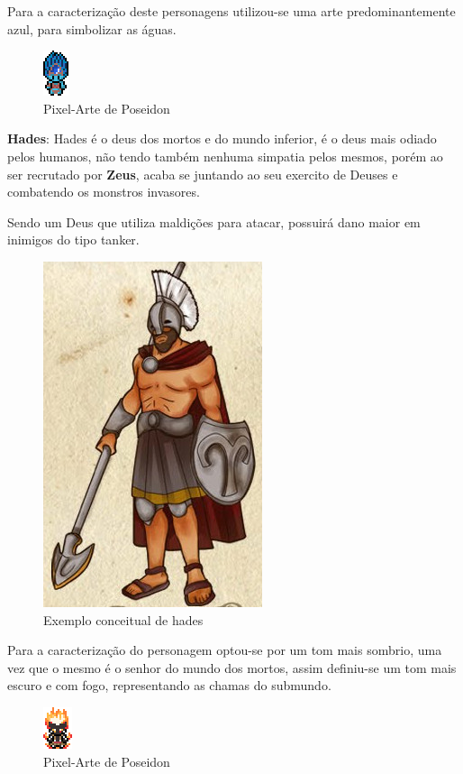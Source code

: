 \documentclass[11pt]{article} %
\begin{document}
Para a caracterização deste personagens utilizou-se uma arte predominantemente azul, para simbolizar as águas.

\begin{figure}[!htp]
\centering
\includegraphics[scale=2]{res/characters/poseidon_panel.png}
\caption{Pixel-Arte de Poseidon}
\label{zeus}
\end{figure}

\newpage

{\large \textbf{Hades}}: Hades é o deus dos mortos e do mundo inferior, é o deus mais odiado pelos humanos, não tendo também nenhuma simpatia pelos mesmos, porém ao ser recrutado por \textbf{Zeus}, acaba se juntando ao seu exercito de Deuses e combatendo os monstros invasores.

Sendo um Deus que utiliza maldições para atacar, possuirá dano maior em inimigos do tipo tanker.

\begin{figure}[!htp]
\centering
\includegraphics[scale=0.25]{res/characters/hades.png}
\caption{Exemplo conceitual de hades}
\label{satiro}
\end{figure}

Para a caracterização do personagem optou-se por um tom mais sombrio, uma vez que o mesmo é o senhor do mundo dos mortos, assim definiu-se um tom mais escuro e com fogo, representando as chamas do submundo.

\begin{figure}[!htp]
\centering
\includegraphics[scale=2]{res/characters/hades_panel.png}
\caption{Pixel-Arte de Poseidon}
\label{zeus}
\end{figure}
\end{document}
